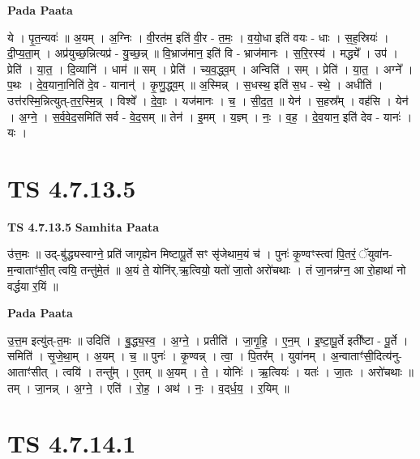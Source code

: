 \documentclass[17pt]{extarticle}
\begin{document}
\textbf{Pada Paata} \newline

ये । पृ॒त॒न्यवः॑ ॥ अ॒यम् । अ॒ग्निः । वी॒रत॑म॒ इति॑ वी॒र - त॒मः॒ । व॒यो॒धा इति॑ वयः - धाः । स॒ह॒स्रियः॑ । दी॒प्य॒ता॒म् । अप्र॑युच्छ॒न्नित्यप्र॑ - यु॒च्छ॒न्न् ॥ वि॒भ्राज॑मान॒ इति॑ वि - भ्राज॑मानः । स॒रि॒रस्य॑ । मद्ध्ये᳚ । उप॑ । प्रेति॑ । या॒त॒ । दि॒व्यानि॑ । धाम॑ ॥ सम् । प्रेति॑ । च्य॒व॒द्ध्व॒म् । अन्विति॑ । सम् । प्रेति॑ । या॒त॒ । अग्ने᳚ । प॒थः । दे॒व॒याना॒निति॑ दे॒व - यानान्॑ । कृ॒णु॒द्ध्व॒म् ॥ अ॒स्मिन्न् । स॒धस्थ॒ इति॑ स॒ध - स्थे॒ । अधीति॑ । उत्त॑रस्मि॒न्नित्युत्-त॒र॒स्मि॒न्न् । विश्वे᳚ । दे॒वाः॒ । यज॑मानः । च॒ । सी॒द॒त॒ ॥ येन॑ । स॒हस्र᳚म् । वह॑सि । येन॑ । अ॒ग्ने॒ । स॒र्व॒वे॒द॒समिति॑ सर्व - वे॒द॒सम् ॥ तेन॑ । इ॒मम् । य॒ज्ञ्म् । नः॒ । व॒ह॒ । दे॒व॒यान॒ इति॑ देव - यानः॑ । यः ।  \newline




\section*{ TS 4.7.13.5 }

\textbf{TS 4.7.13.5 } \newline
\textbf{Samhita Paata} \newline

उ॑त्त॒मः ॥ उद्-बु॑द्ध्यस्वाग्ने॒ प्रति॑ जागृह्येन मिष्टापू॒र्ते सꣳ सृ॑जेथाम॒यं च॑ । पुनः॑ कृ॒ण्वꣳस्त्वा॑ पि॒तरं॒ ॅयुवा॑न-म॒न्वाताꣳ॑सी॒त् त्वयि॒ तन्तु॑मे॒तं ॥ अ॒यं ते॒ योनि॑र्.ऋ॒त्वियो॒ यतो॑ जा॒तो अरो॑चथाः । तं जा॒नन्न॑ग्न॒ आ रो॒हाथा॑ नो वर्द्धया र॒यिं ॥ \newline

\textbf{Pada Paata} \newline

उ॒त्त॒म इत्यु॑त्-त॒मः ॥ उदिति॑ । बु॒द्ध्य॒स्व॒ । अ॒ग्ने॒ । प्रतीति॑ । जा॒गृ॒हि॒ । ए॒न॒म् । इ॒ष्टा॒पू॒र्ते इती᳚ष्टा - पू॒र्ते । समिति॑ । सृ॒जे॒था॒म् । अ॒यम् । च॒ ॥ पुनः॑ । कृ॒ण्वन्न् । त्वा॒ । पि॒तर᳚म् । युवा॑नम् । अ॒न्वाताꣳ॑सी॒दित्य॑नु-आताꣳ॑सीत् । त्वयि॑ । तन्तु᳚म् । ए॒तम् ॥ अ॒यम् । ते॒ । योनिः॑ । ऋ॒त्वियः॑ । यतः॑ । जा॒तः । अरो॑चथाः ॥ तम् । जा॒नन्न् । अ॒ग्ने॒ । एति॑ । रो॒ह॒ । अथ॑ । नः॒ । व॒द्‌र्ध॒य॒ । र॒यिम् ॥  \newline




\section*{ TS 4.7.14.1 }
\end{document}

